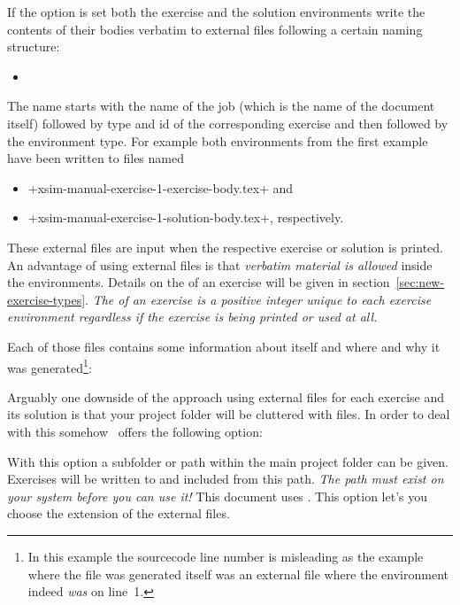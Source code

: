 \documentclass{xsim-manual}
\begin{document}
If the option  is set both the exercise and the
solution environments write the contents of their bodies verbatim to external
files following a certain naming structure:
\begin{itemize}
  \item
\end{itemize}
The name starts with the name of the job (which is the name of the document
itself) followed by type and id of the corresponding exercise and then
followed by the environment type.  For example both environments from the first
example have been written to files named
\begin{itemize}
  \item \verbcode+xsim-manual-exercise-1-exercise-body.tex+ and
  \item \verbcode+xsim-manual-exercise-1-solution-body.tex+, respectively.
\end{itemize}
These external files are input when the respective exercise or solution is
printed.  An advantage of using external files is that \emph{verbatim material
  is allowed} inside the environments.  Details on the  of an
exercise will be given in section~\vref{sec:new-exercise-types}.  \emph{The
   of an exercise is a positive integer unique to each exercise
  environment regardless if the exercise is being printed or used at all.}

Each of those files contains some information about itself and where and why
it was generated\footnote{In this example the sourcecode line number is
  misleading as the example where the file was generated itself was an
  external file where the  environment indeed \emph{was} on
  line~1.}:


Arguably one downside of the approach using external files for each exercise
and its solution is that your project folder will be cluttered with files.  In
order to deal with this somehow \xsim\ offers the following option:
\begin{options}
  \Default
    With this option a subfolder or path within the main project folder can be
    given.  Exercises will be written to and included from this path.
    \emph{The path must exist on your system before you can use it!} This
    document uses .
    This option let's you choose the extension of the
    external files.
\end{options}
\end{document}
